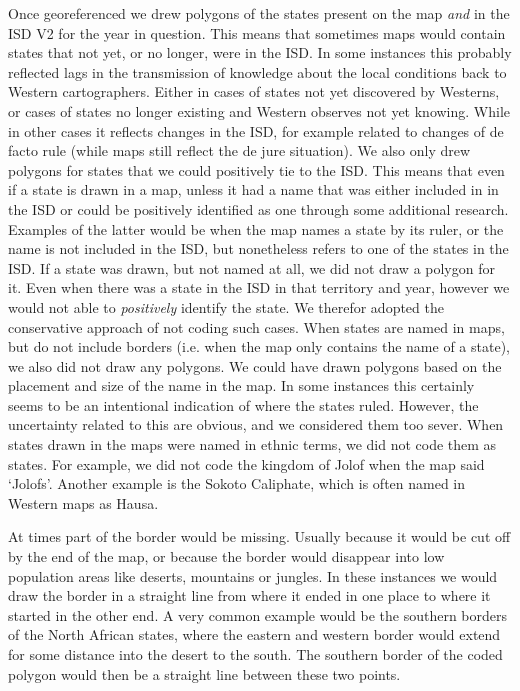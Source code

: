 \documentclass[12pt]{article}
\begin{document}
Once georeferenced we drew polygons of the states present on the map \emph{and}
in the ISD V2 for the year in question. 
This means that sometimes maps would contain states that not yet, or no longer, were in the ISD.
In some instances this probably reflected lags in the transmission of knowledge about the local conditions back to Western cartographers. 
Either in cases of states not yet discovered by Westerns, or cases of states no longer existing and Western observes not yet knowing.
While in other cases it reflects changes in the ISD, for example related to changes of de facto rule (while maps still reflect the de jure situation).
We also only drew polygons for states that we could positively tie to the ISD.
This means that even if a state is drawn in a map, unless it had a name that was either included in in the ISD or could be positively identified as one through some additional research.
Examples of the latter would be when the map names a state by its ruler, or the name is not included in the ISD, but nonetheless refers to one of the states in the ISD.
If a state was drawn, but not named at all, we did not draw a polygon for it.
Even when there was a state in the ISD in that territory and year, however we would not able to \emph{positively} identify the state.
We therefor adopted the conservative approach of not coding such cases.
When states are named in maps, but do not include borders (i.e. when the map only contains the name of a state), we also did not draw any polygons.
We could have drawn polygons based on the placement and size of the name in the map. 
In some instances this certainly seems to be an intentional indication of where the states ruled. 
However, the uncertainty related to this are obvious, and we considered them too sever.
When states drawn in the maps were named in ethnic terms, we did not code them as states.
For example, we did not code the kingdom of Jolof when the map said `Jolofs'. 
Another example is the Sokoto Caliphate, which is often named in Western maps as Hausa. 

At times part of the border would be missing.
Usually because it would be cut off by the end of the map, or because the border would disappear into low population areas like deserts, mountains or jungles.
In these instances we would draw the border in a straight line from where it ended in one place to where it started in the other end. 
A very common example would be the southern borders of the North African states, where the eastern and western border would extend for some distance into the desert to the south. 
The southern border of the coded polygon would then be a straight line between these two points.
\end{document}
